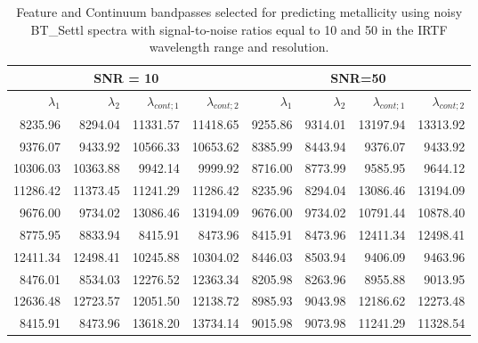 \begin{table}
\begin{center}
\begin{tabular}{rrrr | rrrr}
  \hline
 \multicolumn{4}{c}{SNR = 10} &  \multicolumn{4}{c}{SNR=50} \\
  \hline
$\lambda_1$ & $\lambda_2$ & $\lambda_{cont;1}$ & $\lambda_{cont;2} $ & $\lambda_1$ & $\lambda_2$ & $\lambda_{cont;1}$ & $\lambda_{cont;2} $ \\ 
  \hline

8235.96  & 8294.04  &	11331.57 & 11418.65 & 9255.86 & 9314.01   &     13197.94 & 13313.92  \\
9376.07  & 9433.92  &	10566.33 & 10653.62 & 8385.99 & 8443.94   &     9376.07  & 9433.92    \\
10306.03 & 10363.88 &	 9942.14 & 9999.92  & 8716.00 & 8773.99   &     9585.95  & 9644.12    \\
11286.42 & 11373.45 &	11241.29 & 11286.42 & 8235.96 & 8294.04   &     13086.46 & 13194.09  \\
9676.00  & 9734.02  &	13086.46 & 13194.09 & 9676.00 & 9734.02   &     10791.44 & 10878.40  \\
8775.95  & 8833.94  &	8415.91  & 8473.96  & 8415.91 & 8473.96   &     12411.34 & 12498.41  \\
12411.34 & 12498.41 &	10245.88 & 10304.02 & 8446.03 & 8503.94   &     9406.09  & 9463.96    \\
8476.01  & 8534.03  &	12276.52 & 12363.34 & 8205.98 & 8263.96   &     8955.88  & 9013.95    \\
12636.48 & 12723.57 &	12051.50 & 12138.72 & 8985.93 & 9043.98   &     12186.62 & 12273.48  \\
8415.91  & 8473.96  &	13618.20 & 13734.14 & 9015.98 & 9073.98   &     11241.29 & 11328.54  \\

\hline
\end{tabular}
\caption {Feature and Continuum bandpasses selected for predicting metallicity 
      using noisy BT\_Settl spectra with signal-to-noise ratios
      equal to 10 and 50 in the IRTF wavelength range
  and resolution.} \label{tab:irtf-met-noisy}
\end{center}
\end{table}

